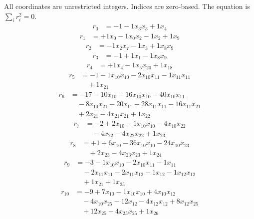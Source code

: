 \begingroup\small
All coordinates are unrestricted integers. Indices are zero-based. The equation is $\sum_i r_i^2=0$.
\[\begin{aligned}
r_{0} &= - 1 - 1 x_{3} x_{3} + 1 x_{4}
\end{aligned}\]
\[\begin{aligned}
r_{1} &= + 1 x_{0} - 1 x_{0} x_{2} - 1 x_{2} + 1 x_{9}
\end{aligned}\]
\[\begin{aligned}
r_{2} &= - 1 x_{2} x_{7} - 1 x_{3} + 1 x_{8} x_{9}
\end{aligned}\]
\[\begin{aligned}
r_{3} &= - 1 + 1 x_{1} - 1 x_{8} x_{9}
\end{aligned}\]
\[\begin{aligned}
r_{4} &= + 1 x_{4} - 1 x_{5} x_{20} + 1 x_{18}
\end{aligned}\]
\[\begin{aligned}
r_{5} &= - 1 - 1 x_{10} x_{10} - 2 x_{10} x_{11} - 1 x_{11} x_{11} \\
 &\quad + 1 x_{21}
\end{aligned}\]
\[\begin{aligned}
r_{6} &= - 17 - 10 x_{10} - 16 x_{10} x_{10} - 40 x_{10} x_{11} \\
 &\quad - 8 x_{10} x_{21} - 20 x_{11} - 28 x_{11} x_{11} - 16 x_{11} x_{21} \\
 &\quad + 2 x_{21} - 4 x_{21} x_{21} + 1 x_{22}
\end{aligned}\]
\[\begin{aligned}
r_{7} &= - 2 + 2 x_{10} - 1 x_{10} x_{10} - 4 x_{10} x_{22} \\
 &\quad - 4 x_{22} - 4 x_{22} x_{22} + 1 x_{23}
\end{aligned}\]
\[\begin{aligned}
r_{8} &= + 1 + 6 x_{10} - 36 x_{10} x_{10} - 24 x_{10} x_{23} \\
 &\quad + 2 x_{23} - 4 x_{23} x_{23} + 1 x_{24}
\end{aligned}\]
\[\begin{aligned}
r_{9} &= - 3 - 1 x_{10} x_{10} - 2 x_{10} x_{11} - 1 x_{11} \\
 &\quad - 2 x_{11} x_{11} - 2 x_{11} x_{12} - 1 x_{12} - 1 x_{12} x_{12} \\
 &\quad + 1 x_{21} + 1 x_{25}
\end{aligned}\]
\[\begin{aligned}
r_{10} &= - 9 + 7 x_{10} - 1 x_{10} x_{10} + 4 x_{10} x_{12} \\
 &\quad - 4 x_{10} x_{25} - 12 x_{12} - 4 x_{12} x_{12} + 8 x_{12} x_{25} \\
 &\quad + 12 x_{25} - 4 x_{25} x_{25} + 1 x_{26}
\end{aligned}\]
